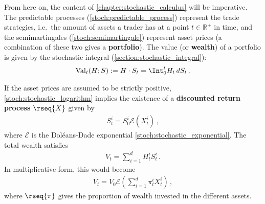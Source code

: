     From here on, the content of \cref{chapter:stochastic_calculus} will be imperative. The predictable processes (\cref{stoch:predictable_process}) represent the trade strategies, i.e.~the amount of assets a trader has at a point $t\in\mathbb{R}^+$ in time, and the semimartingales (\cref{stoch:semimartingale}) represent asset prices (a combination of these two gives a \textbf{portfolio}). The value (or \textbf{wealth}) of a portfolio is given by the stochastic integral (\cref{section:stochastic_integral}):
    \begin{gather}
        \mathrm{Val}_t(H;S) := H\cdot S_t = \Int_0^tH_t\,dS_t\,.
    \end{gather}

    If the asset prices are assumed to be strictly positive, \cref{stoch:stochastic_logarithm} implies the existence of a \textbf{discounted return process} $\rseq{X}$ given by
    \begin{gather}
        S_t^i = S_0^i\mathcal{E}(X_t^i)\,,
    \end{gather}
    where $\mathcal{E}$ is the Dol\'eans-Dade exponential \cref{stoch:stochastic_exponential}. The total wealth satisfies
    \begin{gather}
        V_t = \sum_{i=1}^dH_t^iS_t^i\,.
    \end{gather}
    In multiplicative form, this would become
    \begin{gather}
        V_t = V_0\mathcal{E}\left(\sum_{i=1}^d\pi_t^iX_t^i\right)\,,
    \end{gather}
    where $\rseq{\pi}$ gives the proportion of wealth invested in the different assets.


